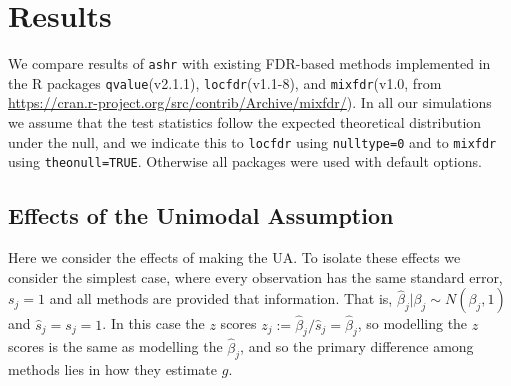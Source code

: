 \documentclass[11pt]{article}
\def\bhat{\hat{\beta}}
\def\shat{\hat{s}}
\def\qvalue{{\tt qvalue}\xspace}
\def\locfdr{{\tt locfdr}\xspace}
\def\mixfdr{{\tt mixfdr}\xspace}
\def\ashr{{\tt ashr}\xspace}
\begin{document}





\section*{Results}

We compare results of \ashr with existing FDR-based methods implemented
in the R packages \qvalue (v2.1.1), \locfdr (v1.1-8), and \mixfdr (v1.0, from \href{https://cran.r-project.org/src/contrib/Archive/mixfdr/}{https://cran.r-project.org/src/contrib/Archive/mixfdr/}).  
In all our simulations we assume that the test statistics follow the expected theoretical distribution under the null, and we indicate this
to \locfdr using {\tt nulltype=0} and to \mixfdr using {\tt theonull=TRUE}. Otherwise all packages were used with default options.


\subsection*{Effects of the Unimodal Assumption}

Here we consider the effects of making the UA. 
To isolate these effects we consider the simplest case, where every observation has the same
standard error, $s_j=1$ and all methods are provided that information. That is,
$\bhat_j | \beta_j \sim N(\beta_j,1)$ and $\shat_j=s_j=1$. In this case the $z$ scores $z_j:=\bhat_j/\shat_j=\bhat_j$, so modelling the $z$ scores is the same as modelling the $\bhat_j$, and so the primary difference among methods lies in how they estimate $g$.
\end{document}
